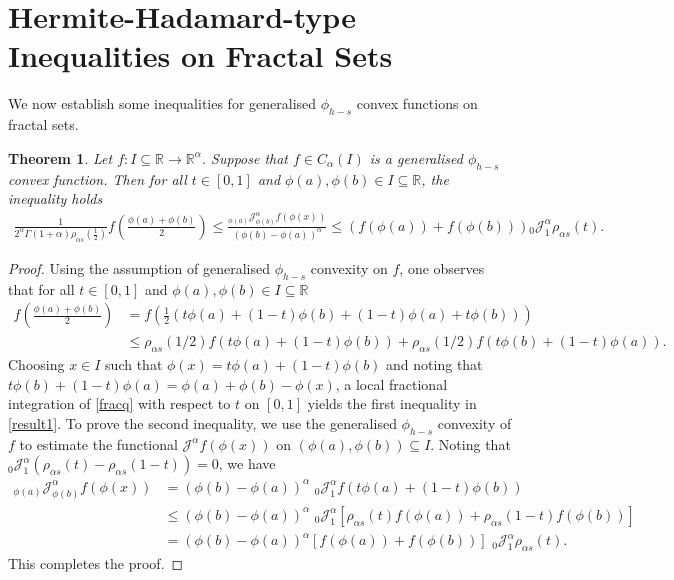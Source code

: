 \documentclass[10pt]{article}
\newtheorem{theo}{Theorem}[section]
\begin{document}
\section{Hermite-Hadamard-type Inequalities on Fractal Sets}
We now establish some inequalities for generalised $\phi_{h-s}$ convex functions on fractal sets. 
\begin{theo}\label{p1} 
Let $f:I\subseteq\mathbb{R}\rightarrow\mathbb{R}^\alpha$. Suppose that $f\in C_\alpha(I)$ is a generalised $\phi_{h-s}$ convex function. Then for all $t\in [0, 1]$ and $\phi(a), \phi(b)\in I\subseteq \mathbb{R}$, the  inequality holds
\begin{align}
\frac{1}{2^\alpha\Gamma(1+\alpha)\rho_{\alpha s}\left(\frac{1}{2}\right)}f\left( \frac{\phi(a)+\phi(b)}{2}  \right) \leq \frac{ {}_{\phi(a)}{\mathcal{J}}_{\phi(b)}^{\alpha} f(\phi(x))}{(\phi(b)-\phi(a))^\alpha} \leq \left(f(\phi(a)) +f(\phi(b))\right) {}_0\mathcal{J}_1^\alpha\rho_{\alpha s}(t)    .  \label{result1}
\end{align}
\end{theo}

\begin{proof}
Using the assumption of generalised $\phi_{h-s}$ convexity on $f$, one observes that for all $t\in [0, 1]$ and $\phi(a), \phi(b)\in I\subseteq \mathbb{R}$
\begin{align}
f\left(\frac{\phi(a)+\phi(b)}{2}\right)&= f\left(\frac{1}{2}\left( t\phi(a)+ (1-t)\phi(b) + (1-t)\phi(a) +t \phi(b)   \right)\right)   \nonumber
\\&\leq    \rho_{\alpha s}(1/2) f(t\phi(a)+(1-t)\phi(b)) + \rho_{\alpha s}(1/2) f(t\phi(b)+(1-t)\phi(a))  .           \label{fracq}
\end{align}
Choosing $x\in I$ such that $\phi(x)=t\phi(a)+(1-t)\phi(b)$ and noting that $t\phi(b)+(1-t)\phi(a)= \phi(a)+\phi(b)-\phi(x)$,
 a local fractional integration of \eqref{fracq} with respect to $t$ on $[0,1]$ yields the first inequality in \eqref{result1}.
To prove the second inequality, we use the generalised $\phi_{h-s}$ convexity of $f$ to estimate the functional $\mathcal{J}^\alpha f(\phi(x))$ on $(\phi(a), \phi(b))\subseteq I$. Noting that ${}_{0}\mathcal{J}^\alpha_{1} (\rho_{\alpha s}(t)- \rho_{\alpha s}(1-t))=0$, we have
\begin{align}
{}_{\phi(a)}\mathcal{J}^\alpha_{\phi(b)} f(\phi(x)) &= (\phi(b)-\phi(a))^\alpha\,\, {}_{0}\mathcal{J}^\alpha_{1} f(t\phi(a)+(1-t)\phi(b))  \nonumber
\\& \leq (\phi(b)-\phi(a))^\alpha\,\, {}_{0}\mathcal{J}^\alpha_{1}\left[ \rho_{\alpha s}(t) f(\phi(a)) +\rho_{\alpha s}(1-t) f(\phi(b)) \right] \nonumber
\\&= (\phi(b)-\phi(a))^\alpha [f(\phi(a))+f(\phi(b))] \,\,{}_{0}\mathcal{J}^\alpha_{1}\rho_{\alpha s}(t) . \nonumber
\end{align}
This completes the proof.
\end{proof}
\end{document}
